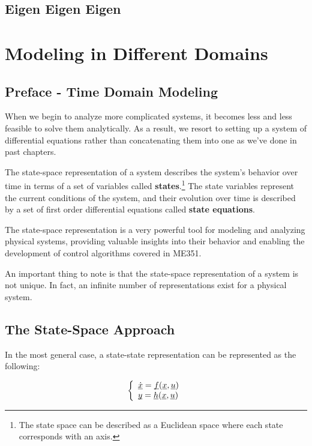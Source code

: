 \documentclass{report}
\begin{document}
\begin{onehalfspacing}
\begin{flushleft}
\section{Eigen Eigen Eigen}

\chapter{Modeling in Different Domains}

\section*{Preface - Time Domain Modeling}

When we begin to analyze more complicated systems, it becomes less and less feasible to solve them analytically. As a result, we resort to setting up a system of differential equations rather than concatenating them into one as we've done in past chapters.

\medskip

The state-space representation of a system describes the system's behavior over time in terms of a set of variables called \textbf{states}.\footnote{The state space can be described as a Euclidean space where each state corresponds with an axis.} The state variables represent the current conditions of the system, and their evolution over time is described by a set of first order differential equations called \textbf{state equations}.

\medskip

The state-space representation is a very powerful tool for modeling and analyzing physical systems, providing valuable insights into their behavior and enabling the development of control algorithms covered in ME351.

\medskip

An important thing to note is that the state-space representation of a system is not unique. In fact, an infinite number of representations exist for a physical system.

\section{The State-Space Approach}

In the most general case, a state-state representation can be represented as the following:

\begin{equation*}
    \left\{ \begin{array}{ll}
        \underbar{\(\dot{x}\)} = \underbar{\(f\)}(\underbar{\(x\)}, \underbar{\(u\)}) \\
        \underbar{\(y\)} = \underbar{\(h\)}(\underbar{\(x\)}, \underbar{\(u\)})
    \end{array} \right.
\end{equation*}


\end{flushleft}
\end{onehalfspacing}
\end{document}
